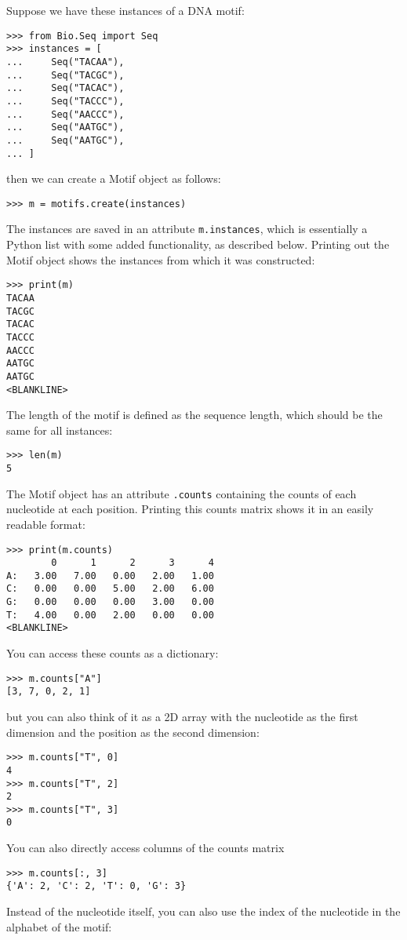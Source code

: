 Suppose we have these instances of a DNA motif:

\begin{verbatim}
>>> from Bio.Seq import Seq
>>> instances = [
...     Seq("TACAA"),
...     Seq("TACGC"),
...     Seq("TACAC"),
...     Seq("TACCC"),
...     Seq("AACCC"),
...     Seq("AATGC"),
...     Seq("AATGC"),
... ]
\end{verbatim}
then we can create a Motif object as follows:

\begin{verbatim}
>>> m = motifs.create(instances)
\end{verbatim}
The instances are saved in an attribute \verb+m.instances+, which is essentially a Python list with some added functionality, as described below.
Printing out the Motif object shows the instances from which it was constructed:

\begin{verbatim}
>>> print(m)
TACAA
TACGC
TACAC
TACCC
AACCC
AATGC
AATGC
<BLANKLINE>
\end{verbatim}
The length of the motif is defined as the sequence length, which should be the same for all instances:

\begin{verbatim}
>>> len(m)
5
\end{verbatim}
The Motif object has an attribute \verb+.counts+ containing the counts of each
nucleotide at each position. Printing this counts matrix shows it in an easily readable format:

\begin{verbatim}
>>> print(m.counts)
        0      1      2      3      4
A:   3.00   7.00   0.00   2.00   1.00
C:   0.00   0.00   5.00   2.00   6.00
G:   0.00   0.00   0.00   3.00   0.00
T:   4.00   0.00   2.00   0.00   0.00
<BLANKLINE>
\end{verbatim}

You can access these counts as a dictionary:

\begin{verbatim}
>>> m.counts["A"]
[3, 7, 0, 2, 1]
\end{verbatim}
but you can also think of it as a 2D array with the nucleotide as the first
dimension and the position as the second dimension:

\begin{verbatim}
>>> m.counts["T", 0]
4
>>> m.counts["T", 2]
2
>>> m.counts["T", 3]
0
\end{verbatim}
You can also directly access columns of the counts matrix
\begin{verbatim}
>>> m.counts[:, 3]
{'A': 2, 'C': 2, 'T': 0, 'G': 3}
\end{verbatim}
Instead of the nucleotide itself, you can also use the index of the nucleotide
in the alphabet of the motif:

